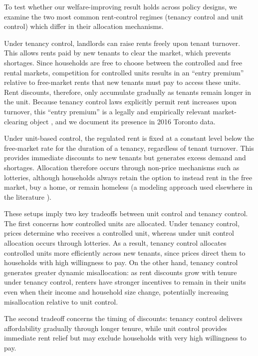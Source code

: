 \documentclass[parskip=full]{article}
\begin{document}
To test whether our welfare-improving result holds across policy designs, we examine the two most common rent‑control regimes (tenancy control and unit control) which differ in their allocation mechanisms.

Under tenancy control, landlords can raise rents freely upon tenant turnover. This allows rents paid by new tenants to clear the market, which prevents shortages. Since households are free to choose between the controlled and free rental markets, competition for controlled units results in an ``entry premium'' relative to free-market rents that new tenants must pay to access these units. Rent discounts, therefore, only accumulate gradually as tenants remain longer in the unit. Because tenancy control laws explicitly permit rent increases upon turnover, this ``entry premium'' is a legally and empirically relevant market-clearing object \citep{arnott-1995}, and we document its presence in 2016 Toronto data.

Under unit-based control, the regulated rent is fixed at a constant level below the free-market rate for the duration of a tenancy, regardless of tenant turnover. This provides immediate discounts to new tenants but generates excess demand and shortages. Allocation therefore occurs through non-price mechanisms such as lotteries, although households always retain the option to instead rent in the free market, buy a home, or remain homeless (a modeling approach used elsewhere in the literature \citep{fmn-2023}). 

These setups imply two key tradeoffs between unit control and tenancy control. The first concerns how controlled units are allocated. Under tenancy control, prices determine who receives a controlled unit, whereas under unit control allocation occurs through lotteries. As a result, tenancy control allocates controlled units more efficiently across new tenants, since prices direct them to households with high willingness to pay. On the other hand, tenancy control generates greater dynamic misallocation: as rent discounts grow with tenure under tenancy control, renters have stronger incentives to remain in their units even when their income and household size change, potentially increasing misallocation relative to unit control.

The second tradeoff concerns the timing of discounts: tenancy control delivers affordability gradually through longer tenure, while unit control provides immediate rent relief but may exclude households with very high willingness to pay.
\end{document}
